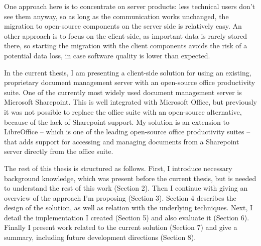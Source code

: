 One approach here is to concentrate on server products: less technical users
don't see them anyway, so as long as the communication works unchanged, the
migration to open-source components on the server side is relatively easy. An
other approach is to focus on the client-side, as important data is rarely
stored there, so starting the migration with the client components avoids the
risk of a potential data loss, in case software quality is lower than expected.

In the current thesis, I am presenting a client-side solution for using an
existing, proprietary document management server with an open-source office
productivity suite. One of the currently most widely used document management
server is Microsoft Sharepoint\cite{sharepoint}. This is well integrated with
Microsoft Office, but previously it was not possible to replace the office
suite with an open-source alternative, because of the lack of Sharepoint
support. My solution is an extension to LibreOffice -- which is one of the
leading open-source office productivity suites -- that adds support for
accessing and managing documents from a Sharepoint server directly from the
office suite.

The rest of this thesis is structured as follows. First, I introduce
necessary background knowledge, which was present before the current thesis,
but is needed to understand the rest of this work (Section 2). Then I continue
with giving an overview of the approach I'm proposing (Section 3). Section 4
describes the design of the solution, as well as relation with the underlying
techniques. Next, I detail the implementation I created (Section 5) and also
evaluate it (Section 6). Finally I present work related to the current solution
(Section 7) and give a summary, including future development directions
(Section 8).
